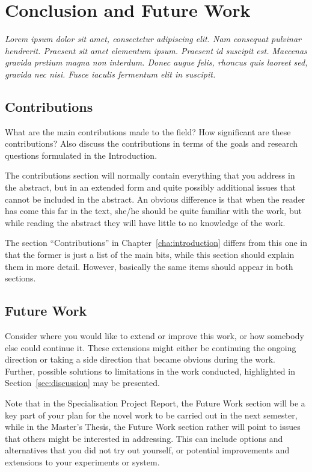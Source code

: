 \chapter{Conclusion and Future Work}
\label{cha:conclusion}

\textit{Lorem ipsum dolor sit amet, consectetur adipiscing elit. Nam consequat pulvinar hendrerit. Praesent sit amet elementum ipsum. Praesent id suscipit est. Maecenas gravida pretium magna non interdum. Donec augue felis, rhoncus quis laoreet sed, gravida nec nisi. Fusce iaculis fermentum elit in suscipit. }

\section{Contributions}
\label{sec:contributions}

What are the main contributions made to the field?
How significant are these contributions?
Also discuss the contributions in terms of the goals and research questions formulated in the Introduction. 

The contributions section will normally contain everything that you address in the abstract, but in an extended form and quite possibly additional issues that cannot be included in the abstract. 
An obvious difference is that when the reader has come this far in the text, she/he should be quite familiar with the work, but while reading the abstract they will have little to no knowledge of the work.

The section ``Contributions'' in Chapter~\ref{cha:introduction} differs from this one in that the former is just a list of the main bits, while this section should explain them in more detail.
However, basically the same items should appear in both sections.

\section{Future Work}
\label{sec:futureWork}

Consider where you would like to extend or improve this work, or how somebody else could continue it.
These extensions might either be continuing the ongoing direction or taking a side direction that became obvious during the work. 
Further, possible solutions to limitations in the work conducted, highlighted in Section~\ref{sec:discussion} may be presented. 

Note that in the Specialisation Project Report, the Future Work section will be a key part of your plan for the novel work to be carried out in the next semester,
while in the Master's Thesis, the Future Work section rather will point to issues that others might be interested in addressing.
This can include options and alternatives that you did not try out yourself, or potential improvements and extensions to your experiments or system.